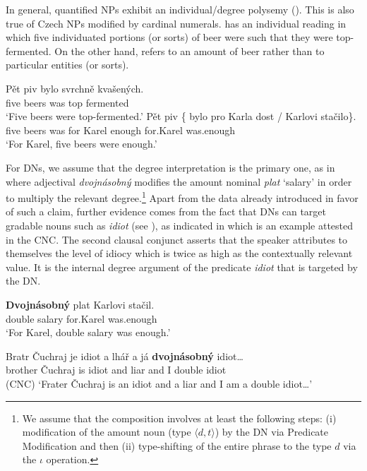\documentclass[output=paper,modfonts,hidelinks,newtxmath
\ChapterDOI{10.5281/zenodo.2545513}
]{langscibook}
\begin{document}
In general, quantified NPs exhibit an individual/degree polysemy (\citealt{rett_polysemy_2014}). This is also true of Czech NPs modified by cardinal numerals.  has an individual reading in which five individuated portions (or sorts) of beer were such that they were top-fermented. On the other hand,  refers to an amount of beer rather than to particular entities (or sorts).

\ea \ea \gll Pět piv bylo svrchně kvašených.\label{individual-reading}\\
five beers was top fermented\\
\glt `Five beers were top-fermented.'
\ex \gll Pět piv \{\hspace{-2pt} bylo pro Karla dost / Karlovi stačilo\}.\label{degree-reading}\\
five beers {} was for Karel enough {} for.Karel was.enough\\
\glt `For Karel, five beers were enough.'
\z \z

\noindent For DNs, we assume that the degree interpretation is the primary one, as in  where adjectival \textit{dvojnásobný} modifies the amount nominal \textit{plat} `salary' in order to multiply the relevant degree.\footnote{We assume that the composition involves at least the following steps: (i) modification of the amount noun (type $\langle d,t\rangle$) by the DN via Predicate Modification and then (ii) type-shifting of the entire phrase to the type $d$ via the $\iota$ operation.} Apart from the data already introduced in favor of such a claim, further evidence comes from the fact that DNs can target gradable nouns such as \textit{idiot} (see \citealt{morzycki2009degree}), as indicated in  which is an example attested in the CNC. The second clausal conjunct asserts that the speaker attributes to themselves the level of idiocy which is twice as high as the contextually relevant value. It is the internal degree argument of the predicate \textit{idiot} that is targeted by the DN.

\ea\label{dvojnasobne-degree-context} \gll \textbf{Dvojnásobný} plat Karlovi stačil.\\
double salary for.Karel was.enough\\
\glt `For Karel, double salary was enough.'
\z

\ea\label{dvojnasobny-idiot-cnc} \gll Bratr Čuchraj je idiot a lhář a já \textbf{dvojnásobný} idiot\ldots \label{dvojnasobny-idiot}\\
brother Čuchraj is idiot and liar and I double idiot\\\hfill(CNC)
\glt `Frater Čuchraj is an idiot and a liar and I am a double idiot\ldots'
\z
\end{document}
